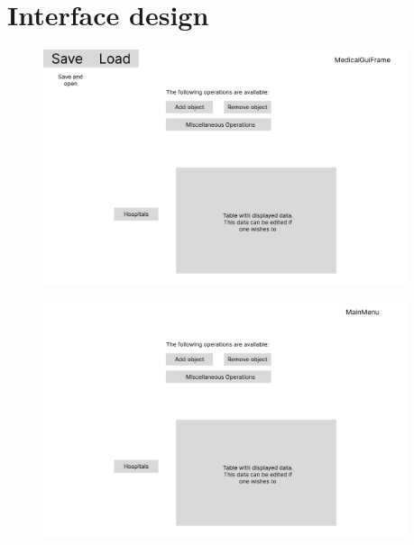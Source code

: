 \documentclass{article}
\begin{document}
\section{Interface design}
\begin{figure}
  \begin{center}
    \includegraphics[width=0.95\textwidth]{./figures/Interface_designs/MedicalGuiFrame.png}
  \end{center}
\end{figure}

\begin{figure}
  \begin{center}
    \includegraphics[width=0.95\textwidth]{./figures/Interface_designs/MainMenu.png}
  \end{center}
\end{figure}
\end{document}
